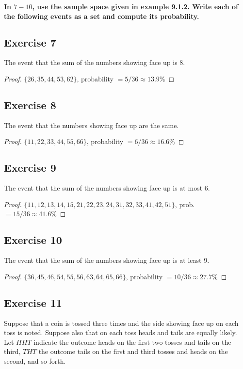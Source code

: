 \documentclass[14pt]{extarticle}
\newcommand{\cy}{\color{cyan}}
\begin{document}
{\bf \cy In $7-10$, use the sample space given in example 9.1.2. Write each of the following events as a set and 
compute its probability.}

\subsection{Exercise 7}
The event that the sum of the numbers showing face up is 8.

\begin{proof}
\(\{26, 35, 44, 53, 62\}\), probability \(= 5/36 \approx 13.9\%\)
\end{proof}

\subsection{Exercise 8}
The event that the numbers showing face up are the same.

\begin{proof}
\(\{11, 22, 33, 44, 55, 66\}\), probability \(= 6/36 \approx 16.6\%\)
\end{proof}

\subsection{Exercise 9}
The event that the sum of the numbers showing face up is at most 6.

\begin{proof}
\(\{11, 12, 13, 14, 15, 21, 22, 23, 24, 31, 32, 33, 41, 42, 51\}\), prob. \(= 15/36 \approx 41.6\%\)
\end{proof}

\subsection{Exercise 10}
The event that the sum of the numbers showing face up is at least 9.

\begin{proof}
\(\{36, 45, 46, 54, 55, 56, 63, 64, 65, 66\}\), probability \(= 10/36 \approx 27.7\%\)
\end{proof}

\subsection{Exercise 11}
Suppose that a coin is tossed three times and the side showing face up on each toss is noted. Suppose also that on 
each toss heads and tails are equally likely. Let \(HHT\) indicate the outcome heads on the first two tosses and 
tails on the third, \(THT\) the outcome tails on the first and third tosses and heads on the second, and so forth.
\end{document}

